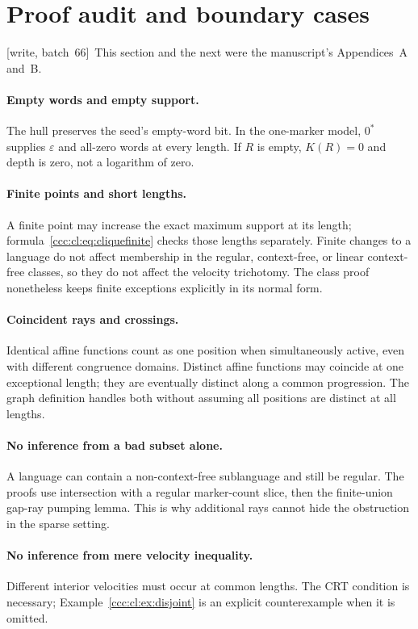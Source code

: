 \documentclass[11pt,letterpaper]{article}
\theoremstyle{definition}
\theoremstyle{remark}
\newcommand{\eps}{\varepsilon}
\newcommand{\wsix}{\textup{[write, batch~66]}}
\begin{document}
\section{Proof audit and boundary cases}\label{ccc:cl:app:audit}

\wsix\ This section and the next were the manuscript's Appendices~A and~B.

\paragraph{Empty words and empty support.}
The hull preserves the seed's empty-word bit. In the one-marker model,
$0^*$ supplies $\eps$ and all-zero words at every length. If $R$ is empty,
$K(R)=0$ and depth is zero, not a logarithm of zero.

\paragraph{Finite points and short lengths.}
A finite point may increase the exact maximum support at its length;
formula~\eqref{ccc:cl:eq:cliquefinite} checks those lengths separately. Finite
changes to a language do not affect membership in the regular,
context-free, or linear context-free classes, so they do not affect the
velocity trichotomy. The class proof nonetheless keeps finite
exceptions explicitly in its normal form.

\paragraph{Coincident rays and crossings.}
Identical affine functions count as one position when simultaneously
active, even with different congruence domains. Distinct affine
functions may coincide at one exceptional length; they are eventually
distinct along a common progression. The graph definition handles both
without assuming all positions are distinct at all lengths.

\paragraph{No inference from a bad subset alone.}
A language can contain a non-context-free sublanguage and still be
regular. The proofs use intersection with a regular marker-count slice,
then the finite-union gap-ray pumping lemma. This is why additional
rays cannot hide the obstruction in the sparse setting.

\paragraph{No inference from mere velocity inequality.}
Different interior velocities must occur at common lengths. The CRT
condition is necessary; Example~\ref{ccc:cl:ex:disjoint} is an explicit
counterexample when it is omitted.
\end{document}
